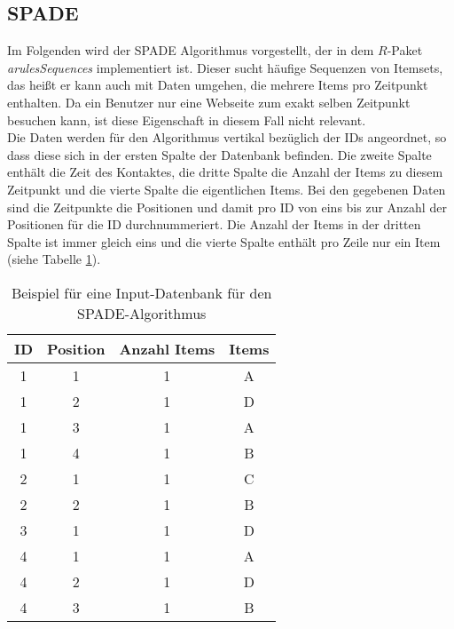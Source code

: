 \subsection{SPADE}
Im Folgenden wird der SPADE Algorithmus \cite{spade} vorgestellt, der in dem $R$-Paket \textit{arulesSequences} \cite{arulesSequences} implementiert ist. Dieser sucht häufige Sequenzen von Itemsets, das heißt er kann auch mit Daten umgehen, die mehrere Items pro Zeitpunkt enthalten. Da ein Benutzer nur eine Webseite zum exakt selben Zeitpunkt besuchen kann, ist diese Eigenschaft in diesem Fall nicht relevant.\\
Die Daten werden für den Algorithmus vertikal bezüglich der IDs angeordnet, so dass diese sich in der ersten Spalte der Datenbank befinden. Die zweite Spalte enthält die Zeit des Kontaktes, die dritte Spalte die Anzahl der Items zu diesem Zeitpunkt und die vierte Spalte die eigentlichen Items. Bei den gegebenen Daten sind die Zeitpunkte die Positionen und damit pro ID von eins bis zur Anzahl der Positionen für die ID durchnummeriert. Die Anzahl der Items in der dritten Spalte ist immer gleich eins und die vierte Spalte enthält pro Zeile nur ein Item (siehe Tabelle \ref{input}).\\
\begin{table}[H]
\centering
\begin{tabular}{c|c|c|c}
ID & Position  & Anzahl Items & Items \\ \hline
1  & 1				 & 1						& A \\
1  & 2				 & 1						& D \\
1  & 3				 & 1						& A \\
1  & 4				 & 1						& B \\
2  & 1				 & 1						& C \\
2  & 2				 & 1						& B \\
3  & 1				 & 1						& D \\
4  & 1				 & 1						& A \\
4  & 2				 & 1						& D \\
4  & 3				 & 1						& B \\
\end{tabular}
\caption{Beispiel für eine Input-Datenbank für den SPADE-Algorithmus}\label{input}
\end{table}

